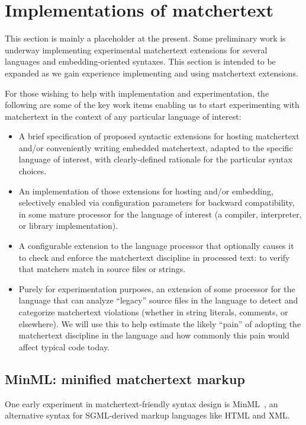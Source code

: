 \section{Implementations of matchertext}
\label{sec:impl}

This section is mainly a placeholder at the present.
Some preliminary work is underway
implementing experimental matchertext extensions
for several languages and embedding-oriented syntaxes.
This section is intended to be expanded
as we gain experience
implementing and using matchertext extensions.

For those wishing to help with implementation and experimentation,
the following are some of the key work items
enabling us to start experimenting with matchertext in the context
of any particular language of interest:
\begin{itemize}
\item	A brief specification of proposed
	syntactic extensions for hosting matchertext
	and/or conveniently writing embedded matchertext,
	adapted to the specific language of interest,
	with clearly-defined rationale for the particular syntax choices.
\item	An implementation of those extensions for hosting and/or embedding,
	selectively enabled via configuration parameters
	for backward compatibility,
	in some mature processor for the language of interest
	(\eg a compiler, interpreter, or library implementation).
\item	A configurable extension to the language processor
	that optionally causes it
	to check and enforce the matchertext discipline
	in processed text:
	\ie to verify that matchers match in source files or strings.
\item	Purely for experimentation purposes,
	an extension of some processor for the language
	that can analyze ``legacy'' source files in the language
	to detect and categorize matchertext violations
	(\eg whether in string literals, comments, or elsewhere).
	We will use this to help estimate the likely ``pain''
	of adopting the matchertext discipline in the language
	and how commonly this pain would affect typical code today.
\end{itemize}


\subsection{MinML: minified matchertext markup}

One early experiment in matchertext-friendly syntax design
is MinML~\cite{ford22minml},
an alternative syntax for SGML-derived markup languages like HTML and XML.

